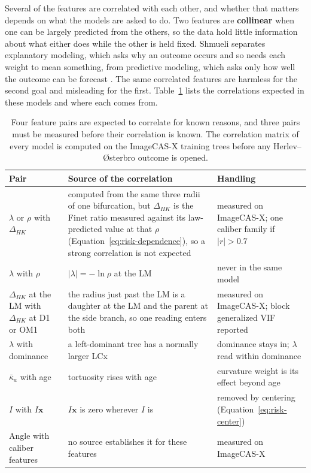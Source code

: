 Several of the features are correlated with each other, and whether that matters depends on what the models are asked to do.
Two features are \textbf{collinear} when one can be largely predicted from the others, so the data hold little information about what either does while the other is held fixed.
Shmueli separates explanatory modeling, which asks why an outcome occurs and so needs each weight to mean something, from predictive modeling, which asks only how well the outcome can be forecast \cite{shmueli2010explain}.
The same correlated features are harmless for the second goal and misleading for the first.
Table~\ref{tab:risk-correlations} lists the correlations expected in these models and where each comes from.

\begin{table}[tbp]
  \centering
  \small
  \caption{Four feature pairs are expected to correlate for known reasons, and three pairs must be measured before their correlation is known.
    The correlation matrix of every model is computed on the ImageCAS-X training trees before any Herlev--{\O}sterbro outcome is opened.}
  \label{tab:risk-correlations}
  \begin{tabular}{@{}p{3.6cm}p{5.4cm}p{5.2cm}@{}}
    \toprule
    Pair & Source of the correlation & Handling \\
    \midrule
    $\lambda$ or $\rho$ with $\Delta_{HK}$ & computed from the same three radii of one bifurcation, but $\Delta_{HK}$ is the Finet ratio measured against its law-predicted value at that $\rho$ (Equation~\ref{eq:risk-dependence}), so a strong correlation is not expected & measured on ImageCAS-X; one caliber family if $\lvert r \rvert > 0.7$ \\
    $\lambda$ with $\rho$ & $\lvert\lambda\rvert = -\ln\rho$ at the LM & never in the same model \\
    $\Delta_{HK}$ at the LM with $\Delta_{HK}$ at D1 or OM1 & the radius just past the LM is a daughter at the LM and the parent at the side branch, so one reading enters both & measured on ImageCAS-X; block generalized VIF reported \\
    $\lambda$ with dominance & a left-dominant tree has a normally larger LCx \cite{dodge1992diameter} & dominance stays in; $\lambda$ read within dominance \\
    $\bar\kappa_a$ with age & tortuosity rises with age \cite{kahe2020tortuosity} & curvature weight is its effect beyond age \\
    $I$ with $I\mathbf{x}$ & $I\mathbf{x}$ is zero wherever $I$ is & removed by centering (Equation~\ref{eq:risk-center}) \\
    Angle with caliber features & no source establishes it for these features & measured on ImageCAS-X \\
    \bottomrule
  \end{tabular}
\end{table}


